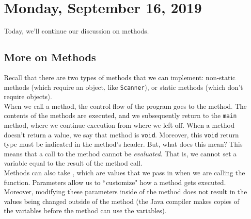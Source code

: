 \section{Monday, September 16, 2019}

Today, we'll continue our discussion on methods. 

\subsection{More on Methods}

Recall that there are two types of methods that we can implement: non-static methods (which require an object, like \verb!Scanner!), or static methods (which don't require objects). \\

When we call a method, the control flow of the program goes to the method. The contents of the methods are executed, and we subsequently return to the \verb!main! method, where we continue execution from where we left off. When a method doesn't return a value, we say that method is \verb!void!. Moreover, this \verb!void! return type must be indicated in the method's header. But, what does this mean? This means that a call to the method cannot be \textit{evaluated}. That is, we cannot set a variable equal to the result of the method call. \\

Methods can also take , which are values that we pass in when we are calling the function. Parameters allow us to ``customize" how a method gets executed. Moreover, modifying these parameters inside of the method does not result in the values being changed outside of the method (the Java compiler makes copies of the variables before the method can use the variables). \\


